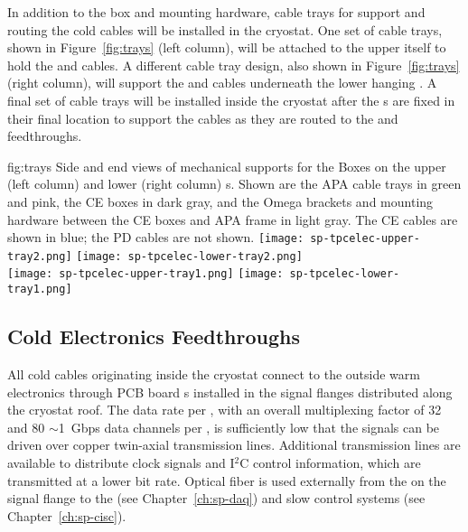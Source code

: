 In addition to the  box and mounting hardware, cable trays for support and routing the cold cables will be installed in the 
cryostat. One set of cable trays, shown in Figure~\ref{fig:trays} (left column), will be attached to the upper  itself 
to hold the  and  cables. A different cable tray design, also shown in Figure~\ref{fig:trays} (right column), will support the  and  cables underneath the lower hanging . A final set of cable trays will be installed inside the 
cryostat after the s are fixed in their final location to support the cables as they are 
routed to the  and  feedthroughs.

\begin{dunefigure}
{fig:trays}
{Side and end views of mechanical supports for the  Boxes on the upper (left column) and lower (right column) s. Shown are the APA cable trays in green and pink, the CE boxes in dark gray, and the Omega brackets and mounting hardware between the CE boxes and APA frame in light gray.  The CE cables are shown in blue; the PD cables are not shown.}
\texttt{[image: sp-tpcelec-upper-tray2.png]}
\hspace{5mm}
\texttt{[image: sp-tpcelec-lower-tray2.png]} \\
\texttt{[image: sp-tpcelec-upper-tray1.png]}
\hspace{5mm}
\texttt{[image: sp-tpcelec-lower-tray1.png]}
\end{dunefigure}

\subsection{Cold Electronics Feedthroughs}
\label{sec:fdsp-tpcelec-design-ft}

All cold cables originating inside the cryostat connect to the outside warm electronics through PCB board \fdth{}s
installed in the signal flanges distributed along the cryostat roof.
The  data rate per , with an overall multiplexing factor of 32 and 80 $\sim$1~Gbps data channels per ,
is sufficiently low that the  signals can be driven over copper twin-axial transmission lines.
Additional transmission lines are available to distribute  clock signals and I$^2$C control information,
which are transmitted at a lower bit rate.
Optical fiber is used externally from the  on the signal flange to the  (see Chapter~\ref{ch:sp-daq}) and slow control systems (see Chapter~\ref{ch:sp-cisc}).


